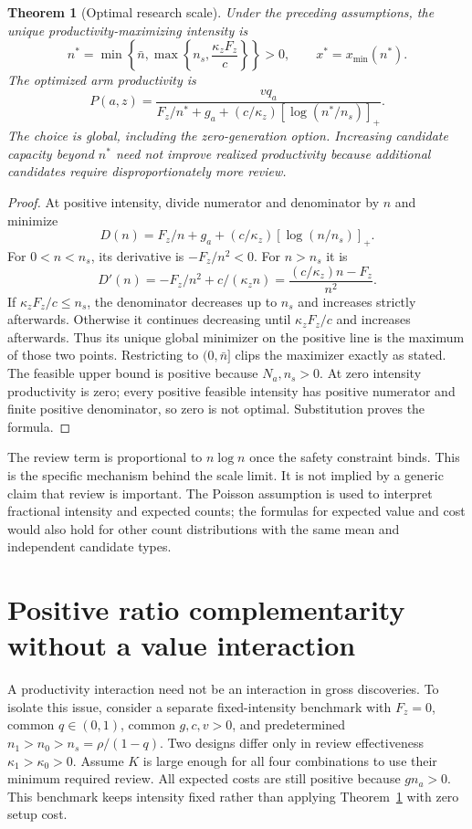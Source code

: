 \documentclass[11pt,a4paper]{article}
\newtheorem{theorem}{Theorem}[section]
\theoremstyle{definition}
\theoremstyle{remark}
\begin{document}
\begin{theorem}[Optimal research scale]\label{th:scale}
Under the preceding assumptions, the unique productivity-maximizing intensity is
\[
 n^*=\min\left\{\bar n,\max\left\{n_s,\frac{\kappa_zF_z}{c}\right\}\right\}>0,
 \qquad x^*=x_{\min}(n^*).
\]
The optimized arm productivity is
\[
 P(a,z)=\frac{vq_a}{F_z/n^*+g_a+(c/\kappa_z)[\log(n^*/n_s)]_+}.
\]
The choice is global, including the zero-generation option. Increasing candidate capacity beyond $n^*$ need not improve realized productivity because additional candidates require disproportionately more review.
\end{theorem}
\begin{proof}
At positive intensity, divide numerator and denominator by $n$ and minimize
\[
 D(n)=F_z/n+g_a+(c/\kappa_z)[\log(n/n_s)]_+.
\]
For $0<n<n_s$, its derivative is $-F_z/n^2<0$. For $n>n_s$ it is
\[
 D'(n)=-F_z/n^2+c/(\kappa_zn)
       =\frac{(c/\kappa_z)n-F_z}{n^2}.
\]
If $\kappa_zF_z/c\leq n_s$, the denominator decreases up to $n_s$ and increases strictly afterwards. Otherwise it continues decreasing until $\kappa_zF_z/c$ and increases afterwards. Thus its unique global minimizer on the positive line is the maximum of those two points. Restricting to $(0,\bar n]$ clips the maximizer exactly as stated. The feasible upper bound is positive because $N_a,n_s>0$. At zero intensity productivity is zero; every positive feasible intensity has positive numerator and finite positive denominator, so zero is not optimal. Substitution proves the formula.
\end{proof}

The review term is proportional to $n\log n$ once the safety constraint binds. This is the specific mechanism behind the scale limit. It is not implied by a generic claim that review is important. The Poisson assumption is used to interpret fractional intensity and expected counts; the formulas for expected value and cost would also hold for other count distributions with the same mean and independent candidate types.

\section{Positive ratio complementarity without a value interaction}
A productivity interaction need not be an interaction in gross discoveries. To isolate this issue, consider a separate fixed-intensity benchmark with $F_z=0$, common $q\in(0,1)$, common $g,c,v>0$, and predetermined $n_1>n_0>n_s=\rho/(1-q)$. Two designs differ only in review effectiveness $\kappa_1>\kappa_0>0$. Assume $K$ is large enough for all four combinations to use their minimum required review. All expected costs are still positive because $g n_a>0$. This benchmark keeps intensity fixed rather than applying Theorem~\ref{th:scale} with zero setup cost.
\end{document}

